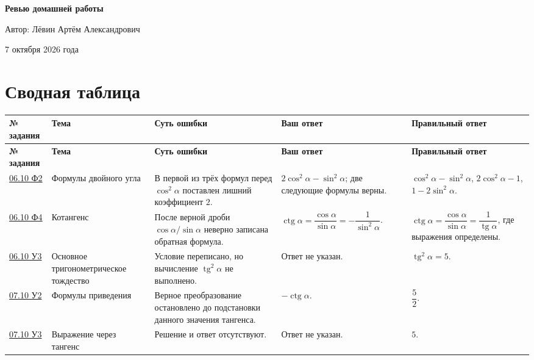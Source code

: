 \documentclass[12pt,a4paper]{article}
\begin{document}
\hypersetup{pageanchor=false}
\begin{titlepage}
\thispagestyle{empty}
\centering
\vspace*{0.23\textheight}
{\Huge\bfseries Ревью домашней работы\par}
\vspace{1.8cm}
{\Large Автор: Лёвин Артём Александрович\par}
\vspace{0.8cm}
{\large 7 октября 2026 года\par}
\vfill
{}
\end{titlepage}
\clearpage
\hypersetup{pageanchor=true}
\setcounter{page}{1}

\pagestyle{review}
\newpage

\section*{Сводная таблица}
\small
\begin{longtable}{p{1.7cm} p{2.7cm} p{4.3cm} p{3.0cm} p{3.0cm}}
\toprule
\textbf{№ задания} & \textbf{Тема} & \textbf{Суть ошибки} & \textbf{Ваш ответ} & \textbf{Правильный ответ} \\
\midrule
\endfirsthead
\toprule
\textbf{№ задания} & \textbf{Тема} & \textbf{Суть ошибки} & \textbf{Ваш ответ} & \textbf{Правильный ответ} \\
\midrule
\endhead
\hyperref[task:0610f2]{06.10 Ф2} & Формулы двойного угла & В первой из трёх формул перед $\cos^2\alpha$ поставлен лишний коэффициент $2$. & $2\cos^2\alpha-\sin^2\alpha$; две следующие формулы верны. & $\cos^2\alpha-\sin^2\alpha$, $2\cos^2\alpha-1$, $1-2\sin^2\alpha$. \\
\midrule
\hyperref[task:0610f4]{06.10 Ф4} & Котангенс & После верной дроби $\cos\alpha/\sin\alpha$ неверно записана обратная формула. & $\operatorname{ctg}\alpha=\dfrac{\cos\alpha}{\sin\alpha}=-\dfrac{1}{\sin^2\alpha}$. & $\operatorname{ctg}\alpha=\dfrac{\cos\alpha}{\sin\alpha}=\dfrac{1}{\operatorname{tg}\alpha}$, где выражения определены. \\
\midrule
\hyperref[task:0610u3]{06.10 У3} & Основное тригонометрическое тождество & Условие переписано, но вычисление $\operatorname{tg}^2\alpha$ не выполнено. & Ответ не указан. & $\operatorname{tg}^2\alpha=5$. \\
\midrule
\hyperref[task:0710u2]{07.10 У2} & Формулы приведения & Верное преобразование остановлено до подстановки данного значения тангенса. & $-\operatorname{ctg}\alpha$. & $\dfrac{5}{2}$. \\
\midrule
\hyperref[task:0710u3]{07.10 У3} & Выражение через тангенс & Решение и ответ отсутствуют. & Ответ не указан. & $5$. \\
\bottomrule
\end{longtable}
\normalsize
\end{document}
